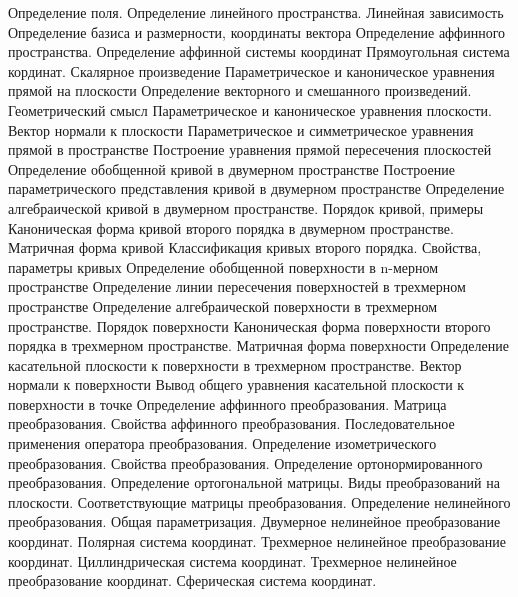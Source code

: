 Определение поля. Определение линейного пространства. Линейная зависимость
Определение базиса и размерности, координаты вектора
Определение аффинного пространства. Определение аффинной системы координат
Прямоугольная система кординат. Скалярное произведение
Параметрическое и каноническое уравнения прямой на плоскости
Определение векторного и смешанного произведений. Геометрический смысл
Параметрическое и каноническое уравнения плоскости. Вектор нормали к плоскости
Параметрическое и симметрическое уравнения прямой в пространстве
Построение уравнения прямой пересечения плоскостей
Определение обобщенной кривой в двумерном пространстве
Построение параметрического представления кривой в двумерном пространстве
Определение алгебраической кривой в двумерном пространстве. Порядок кривой, примеры
Каноническая форма кривой второго порядка в двумерном пространстве. Матричная форма кривой
Классификация кривых второго порядка. Свойства, параметры кривых
Определение обобщенной поверхности в n-мерном пространстве
Определение линии пересечения поверхностей в трехмерном пространстве
Определение алгебраической поверхности в трехмерном пространстве. Порядок поверхности
Каноническая форма поверхности второго порядка в трехмерном пространстве. Матричная форма поверхности
Определение касательной плоскости к поверхности в трехмерном пространстве. Вектор нормали к поверхности
Вывод общего уравнения касательной плоскости к поверхности в точке
Определение аффинного преобразования. Матрица преобразования.
Свойства аффинного преобразования. Последовательное применения оператора преобразования.
Определение изометрического преобразования. Свойства преобразования.
Определение ортонормированного преобразования. Определение ортогональной матрицы.
Виды преобразований на плоскости. Соответствующие матрицы преобразования.
Определение нелинейного преобразования. Общая параметризация.
Двумерное нелинейное преобразование координат. Полярная система координат.
Трехмерное нелинейное преобразование координат. Циллиндрическая система координат.
Трехмерное нелинейное преобразование координат. Сферическая система координат.